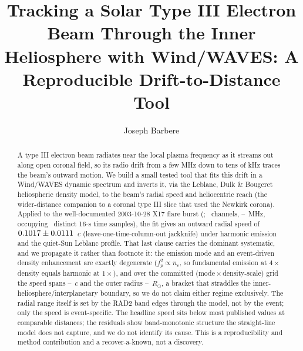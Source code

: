 \documentclass[twocolumn]{aastex631}
\newcommand{\code}[1]{\texttt{#1}}
\begin{document}
\title{Tracking a Solar Type III Electron Beam Through the Inner Heliosphere with Wind/WAVES:
A Reproducible Drift-to-Distance Tool}

\author[0009-0008-3289-4447]{Joseph Barbere}

\begin{abstract}
A type III electron beam radiates near the local plasma frequency as it streams out along open coronal
field, so its radio drift from a few MHz down to tens of kHz traces the beam's outward motion. We build
a small tested tool that fits this drift in a Wind/WAVES \citep{bougeret1995} dynamic spectrum and
inverts it, via the Leblanc, Dulk \& Bougeret \citeyearpar{leblanc1998} heliospheric density model, to
the beam's radial speed and heliocentric reach (the wider-distance companion to a coronal type III
slice that used the Newkirk corona). Applied to the well-documented 2003-10-28 X17 flare burst
(\code{\wwSource}; \wwRealNridge\ channels, \wwRealFlo--\wwRealFhi~MHz, occupying
\wwRealNtimeCols\ distinct 16-s time samples), the fit gives an outward radial speed of
$0.1017\pm0.0111$~$c$ (leave-one-time-column-out jackknife) under harmonic
emission and the quiet-Sun Leblanc profile. That last clause carries the dominant systematic,
and we propagate it rather than footnote it: the emission mode and an event-driven density
enhancement are exactly degenerate ($f_p^2\propto n_e$, so fundamental emission at $4\times$
density equals harmonic at $1\times$), and over the committed
(mode\,$\times$\,density-scale) grid the speed spans \wwRealGridSpeedLo--\wwRealGridSpeedHi~$c$
and the outer radius \wwRealGridReachLo--\wwRealGridReachHi~$R_\odot$, a bracket that straddles
the inner-heliosphere/interplanetary boundary, so we do not claim either regime exclusively. The
radial range itself is set by the RAD2 band edges through the model, not by the event; only the
speed is event-specific. The headline speed sits below most published values at comparable
distances; the residuals show band-monotonic structure the straight-line model does not capture,
and we do not identify its cause. This is a reproducibility and method contribution and a
recover-a-known, not a discovery.
\end{abstract}

\end{document}
